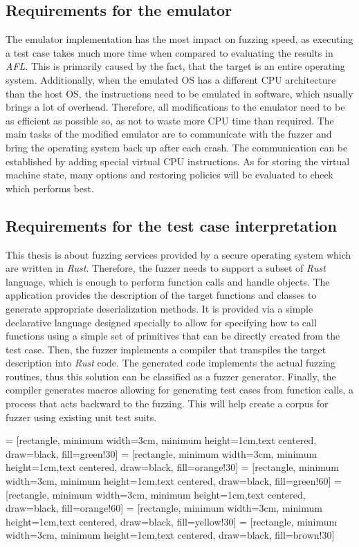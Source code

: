 \subsection{Requirements for the emulator}
The emulator implementation has the most impact on fuzzing speed, as executing a test case takes much more time when compared to evaluating the results in \textit{AFL}. This is primarily caused by the fact, that the target is an entire operating system. Additionally, when the emulated OS has a different CPU architecture than the host OS, the instructions need to be emulated in software, which usually brings a lot of overhead. Therefore, all modifications to the emulator need to be as efficient as possible so, as not to waste more CPU time than required. The main tasks of the modified emulator are to communicate with the fuzzer and bring the operating system back up after each crash. The communication can be established by adding special virtual CPU instructions. As for storing the virtual machine state, many options and restoring policies will be evaluated to check which performs best.

\subsection{Requirements for the test case interpretation}
This thesis is about fuzzing services provided by a secure operating system which are written in \textit{Rust}. Therefore, the fuzzer needs to support a subset of \textit{Rust} language, which is enough to perform function calls and handle objects. The application provides the description of the target functions and classes to generate appropriate deserialization methods. It is provided via a simple declarative language designed specially to allow for specifying how to call functions using a simple set of primitives that can be directly created from the test case. Then, the fuzzer implements a compiler that transpiles the target description into \textit{Rust} code. The generated code implements the actual fuzzing routines, thus this solution can be classified as a fuzzer generator. Finally, the compiler generates macros allowing for generating test cases from function calls, a process that acts backward to the fuzzing. This will help create a corpus for fuzzer using existing unit test suits. 


 = [rectangle, minimum width=3cm, minimum height=1cm,text centered, draw=black, fill=green!30]
 = [rectangle, minimum width=3cm, minimum height=1cm,text centered, draw=black, fill=orange!30]
 = [rectangle, minimum width=3cm, minimum height=1cm,text centered, draw=black, fill=green!60]
 = [rectangle, minimum width=3cm, minimum height=1cm,text centered, draw=black, fill=orange!60]
 = [rectangle, minimum width=3cm, minimum height=1cm,text centered, draw=black, fill=yellow!30]
 = [rectangle, minimum width=3cm, minimum height=1cm,text centered, draw=black, fill=brown!30]

